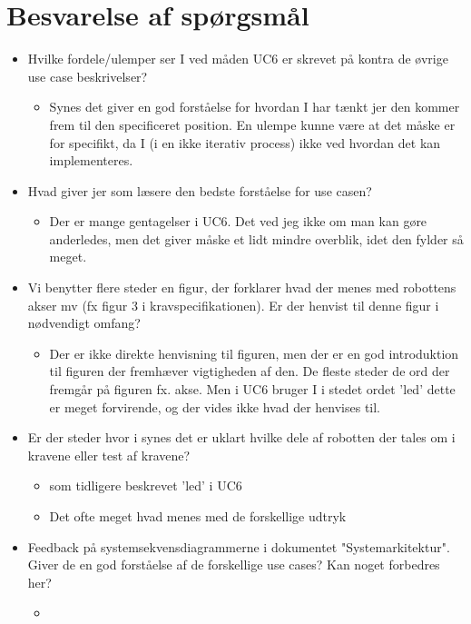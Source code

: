 \documentclass[a4paper,12pt,fleqn,oneside]{article}
\begin{document}

\newpage


\section{Besvarelse af spørgsmål}
\begin{itemize}
    \item Hvilke fordele/ulemper ser I ved måden UC6 er skrevet på kontra de øvrige use case beskrivelser?
    \begin{itemize}
        \item Synes det giver en god forståelse for hvordan I har tænkt jer den kommer frem til den specificeret position. En ulempe kunne være at det måske er for specifikt, da I (i en ikke iterativ process) ikke ved hvordan det kan implementeres.
    \end{itemize}
    \item Hvad giver jer som læsere den bedste forståelse for use casen?
    \begin{itemize}
        \item Der er mange gentagelser i UC6.  Det ved jeg ikke om man kan gøre anderledes, men det giver måske et lidt mindre overblik, idet den fylder så meget.
    \end{itemize}
    \item Vi benytter flere steder en figur, der forklarer hvad der menes med robottens akser mv (fx figur 3 i kravspecifikationen). Er der henvist til denne figur i nødvendigt omfang?
\begin{itemize}
        \item Der er ikke direkte henvisning til figuren, men der er en god introduktion til figuren der fremhæver vigtigheden af den. De fleste steder de ord der fremgår på figuren fx. akse. Men i UC6 bruger I i stedet ordet 'led' dette er meget forvirende, og der vides ikke hvad der henvises til. 
    \end{itemize}
    \item Er der steder hvor i synes det er uklart hvilke dele af robotten der tales om i kravene eller test af kravene?
    \begin{itemize}
        \item som tidligere beskrevet 'led' i UC6
        \item Det ofte meget hvad menes med de forskellige udtryk
    \end{itemize}
    \item Feedback på systemsekvensdiagrammerne i dokumentet "Systemarkitektur". Giver de en god forståelse af de forskellige use cases? Kan noget forbedres her?
    \begin{itemize}
        \item 
    \end{itemize}
\end{itemize}
\end{document}
